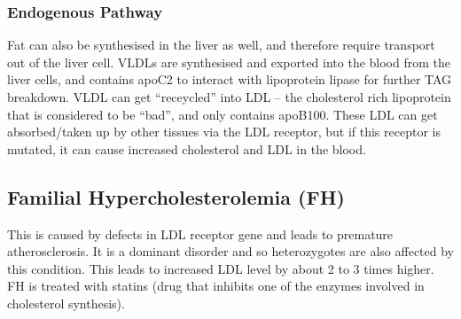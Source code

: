 \subsubsection{Endogenous Pathway}

Fat can also be synthesised in the liver as well, and therefore require transport out of the liver cell.
VLDLs are synthesised and exported into the blood from the liver cells, and contains apoC2 to interact with lipoprotein lipase for further TAG breakdown.
VLDL can get ``receycled'' into LDL -- the cholesterol rich lipoprotein that is considered to be ``bad'', and only contains apoB100.
These LDL can get absorbed/taken up by other tissues via  the LDL receptor, but if this receptor is mutated, it can cause increased cholesterol and LDL in the blood.

\subsection{Familial Hypercholesterolemia (FH)}

This is caused by defects in LDL receptor gene and leads to premature atherosclerosis.
It is a dominant disorder and so heterozygotes are also affected by this condition.
This leads to increased LDL level by about 2 to 3 times higher.
FH is treated with statins (drug that inhibits one of the enzymes involved in cholesterol synthesis).

